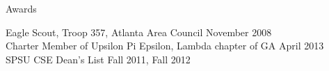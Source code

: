 \documentclass[11pt]{resume} %
\begin{document}
\begin{rSection}{Awards}

{Eagle Scout, Troop 357, Atlanta Area Council} \hfill November 2008\\
{Charter Member of Upsilon Pi Epsilon, Lambda chapter of GA} \hfill April 2013 \\
{SPSU CSE Dean's List} \hfill Fall 2011, Fall 2012

\end{rSection}






\end{document}
